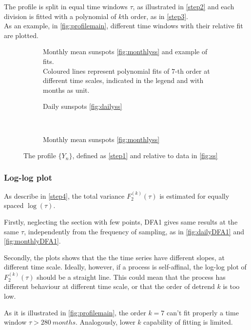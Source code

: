 The profile is split in equal time windows $\tau$, as illustrated in \autoref{step2} and each division is fitted with a polynomial of $k$th order, as in \autoref{step3}.\\ 
As an example, in \autoref{fig:profilemain}, different time windows with their relative fit are plotted.
\begin{figure}[!h]
	\centering
	\begin{subfigure}{\textwidth}
		
		\caption{Monthly mean sunspots \ref{fig:monthlyss} and example of fits. \\ 
		Coloured lines represent polynomial fits of 7-th order at different time scales, indicated in the legend and with months as unit.}\label{fig:profilemain}
	\end{subfigure}
	\begin{subfigure}{0.48\textwidth}
		
		\caption{Daily sunspots \ref{fig:dailyss}}\label{fig:dailyprofile}
	\end{subfigure}
	~
	\begin{subfigure}{0.48\textwidth}
		
		\caption{Monthly mean sunspots \ref{fig:monthlyss}}\label{fig:monthlyprofile}
	\end{subfigure}
	\caption{The profile $\{Y_n\}$, defined as \autoref{step1} and relative to data in \autoref{fig:ss}}\label{fig:profile}
\end{figure}

\subsubsection{Log-log plot}
As describe in \autoref{step4}, the total variance $F_2^{( k )}(\tau)$ is estimated for equally spaced $\log(\tau)$.

Firstly, neglecting the section with few points, DFA1 gives same results at the same $\tau$, independently from the frequency of sampling, as in \autoref{fig:dailyDFA1} and \autoref{fig:monthlyDFA1}.

Secondly, the plots shows that the the time series have different slopes, at different time scale. Ideally, however, if a process is self-affinal, the log-log plot of $F_2^{( k )}(\tau)$ should be a straight line. This could mean that the process has different behaviour at different time scale, or that the order of detrend $k$ is too low.

As it is illustrated in \autoref{fig:profilemain}, the order $k=7$ can't fit properly a time window $\tau > \SI{280}{months}$. Analogously, lower $k$ capability of fitting is limited. 

